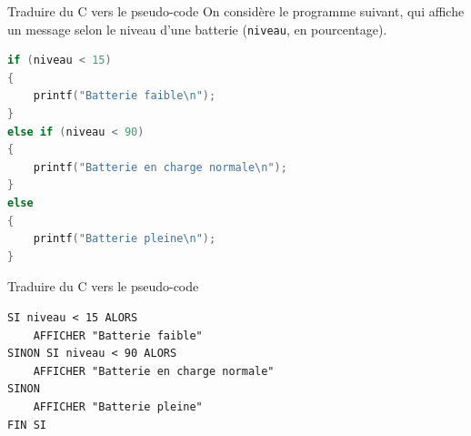\begin{UPSTIexercice}{Traduire du C vers le pseudo-code}
    On considère le programme suivant, qui affiche un message selon le niveau d'une batterie (\texttt{niveau}, en pourcentage).
    \begin{lstlisting}[language=C]
if (niveau < 15)
{
    printf("Batterie faible\n");
}
else if (niveau < 90)
{
    printf("Batterie en charge normale\n");
}
else
{
    printf("Batterie pleine\n");
}
    \end{lstlisting}

\end{UPSTIexercice}

\begin{UPSTIprofOnlyEnv}
    \begin{UPSTIcorrectionP}{Traduire du C vers le pseudo-code}
        \begin{verbatim}
SI niveau < 15 ALORS
    AFFICHER "Batterie faible"
SINON SI niveau < 90 ALORS
    AFFICHER "Batterie en charge normale"
SINON
    AFFICHER "Batterie pleine"
FIN SI
        \end{verbatim}
    \end{UPSTIcorrectionP}
\end{UPSTIprofOnlyEnv}
